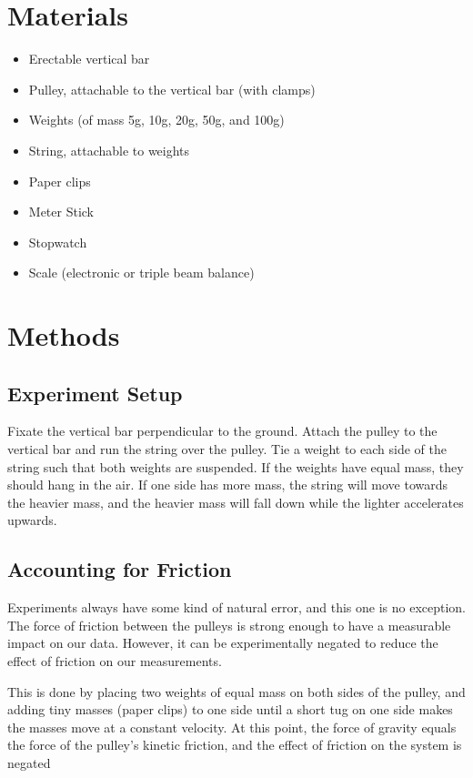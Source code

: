 \documentclass[12pt]{article}
\begin{document}
    \section{Materials}
        \begin{itemize}
            \item Erectable vertical bar
            \item Pulley, attachable to the vertical bar (with clamps)
            \item Weights (of mass 5g, 10g, 20g, 50g, and 100g)
            \item String, attachable to weights
            \item Paper clips
            \item Meter Stick
            \item Stopwatch
            \item Scale (electronic or triple beam balance)
        \end{itemize}
    \section{Methods}
        \subsection{Experiment Setup}
            Fixate the vertical bar perpendicular to the ground. Attach the 
            pulley to the vertical bar and run the string over the pulley.
            Tie a weight to each side of the string such that both weights are
            suspended. If the weights have equal mass, they should hang in the
            air. If one side has more mass, the string will move towards the
            heavier mass, and the heavier mass will fall down while the lighter
            accelerates upwards. 
        \subsection{Accounting for Friction}
            \par Experiments always have some kind of natural error, and this one
            is no exception. The force of friction between the pulleys is
            strong enough to have a measurable impact on our data.
            However, it can be experimentally negated to
            reduce the effect of friction on our measurements.
            \par This is done by placing two weights of equal mass on both sides
            of the pulley, and adding tiny masses (paper clips) to one side until
            a short tug on one side makes the masses move at a constant velocity.
            At this point, the force of gravity equals the force of the pulley's 
            kinetic friction, and the effect of friction on the system is
            negated
\end{document}
